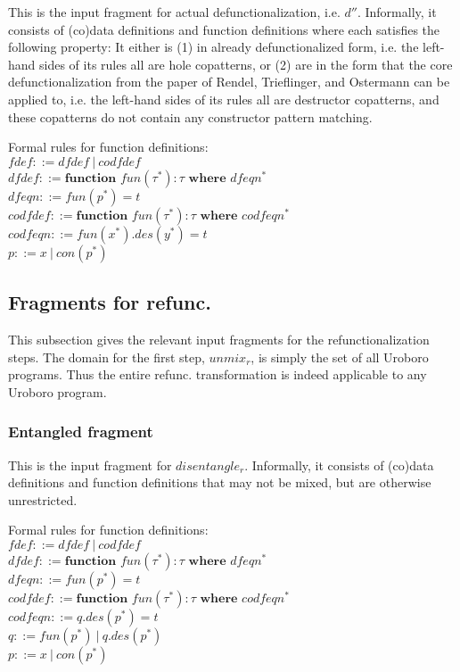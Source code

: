 \documentclass[11pt]{article} %
\begin{document}
This is the input fragment for actual defunctionalization, i.e. $d''$. Informally, it consists of (co)data definitions and function definitions where each satisfies the following property: It either is (1) in already defunctionalized form, i.e. the left-hand sides of its rules all are hole copatterns, or (2) are in the form that the core defunctionalization from the paper of Rendel, Trieflinger, and Ostermann can be applied to, i.e. the left-hand sides of its rules all are destructor copatterns, and these copatterns do not contain any constructor pattern matching.

Formal rules for function definitions:\\
$fdef ::= dfdef ~ | ~ codfdef$\\
$dfdef ::= \textbf{function } fun(\tau^*): \tau \textbf{ where } dfeqn^*$\\
$dfeqn ::= fun(p^*) = t$\\
$codfdef ::= \textbf{function } fun(\tau^*): \tau \textbf{ where } codfeqn^*$\\
$codfeqn ::= fun(x^*).des(y^*) = t$\\
$p ::= x ~ | ~ con(p^*) $\\

\subsection{Fragments for refunc.}

This subsection gives the relevant input fragments for the refunctionalization steps. The domain for the first step, $unmix_r$, is simply the set of all Uroboro programs. Thus the entire refunc. transformation is indeed applicable to any Uroboro program.

\subsubsection{Entangled fragment}

This is the input fragment for $disentangle_r$. Informally, it consists of (co)data definitions and function definitions that may not be mixed, but are otherwise unrestricted.

Formal rules for function definitions:\\
$fdef ::= dfdef ~ | ~ codfdef$\\
$dfdef ::= \textbf{function } fun(\tau^*): \tau \textbf{ where } dfeqn^*$\\
$dfeqn ::= fun(p^*) = t$\\
$codfdef ::= \textbf{function } fun(\tau^*): \tau \textbf{ where } codfeqn^*$\\
$codfeqn ::= q.des(p^*) = t$\\
$q ::= fun(p^*) ~ | ~ q.des(p^*)$\\
$p ::= x ~ | ~ con(p^*) $\\
\end{document}
